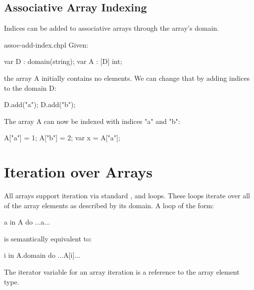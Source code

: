 \subsection{Associative Array Indexing}
\label{Associative_Array_Indexing}

Indices can be added to associative arrays through the array's domain.
\begin{chapelexample}{assoc-add-index.chpl}
Given:
\begin{chapel}
var D : domain(string);
var A : [D] int;
\end{chapel}

the array A initially contains no elements. We can change that by adding
indices to the domain D:
\begin{chapel}
D.add("a");
D.add("b");
\end{chapel}

The array A can now be indexed with indices "a" and "b":

\begin{chapel}
A["a"] = 1;
A["b"] = 2;
var x = A["a"];
\end{chapel}
\end{chapelexample}


\section{Iteration over Arrays}
\label{Iteration_over_Arrays}

All arrays support iteration via standard , 
and  loops.  These loops iterate over all of the array
elements as described by its domain.  A loop of the form:

\begin{chapel}
 a in A do
  ...a...
\end{chapel}

is semantically equivalent to:

\begin{chapel}
 i in A.domain do
  ...A[i]...
\end{chapel}

The iterator variable for an array iteration is a reference to the
array element type.


